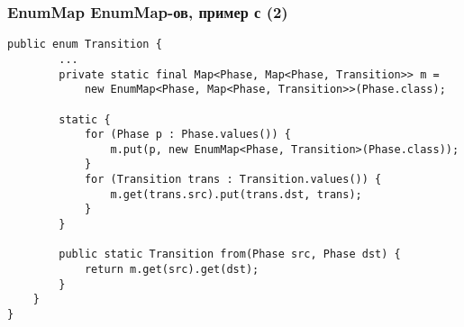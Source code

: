 \documentclass[xetex,mathserif,serif]{beamer}
\begin{document}
	\begin{frame}[fragile]
		\frametitle{EnumMap EnumMap-ов, пример с (2)}
		\begin{footnotesize}
			\begin{verbatim}
public enum Transition {
        ...
        private static final Map<Phase, Map<Phase, Transition>> m =
            new EnumMap<Phase, Map<Phase, Transition>>(Phase.class);
        
        static {
            for (Phase p : Phase.values()) {
                m.put(p, new EnumMap<Phase, Transition>(Phase.class));
            }
            for (Transition trans : Transition.values()) {
                m.get(trans.src).put(trans.dst, trans);
            }
        }
        
        public static Transition from(Phase src, Phase dst) { 
            return m.get(src).get(dst); 
        }
    }
}
			\end{verbatim}
		\end{footnotesize}
	\end{frame}
\end{document}
